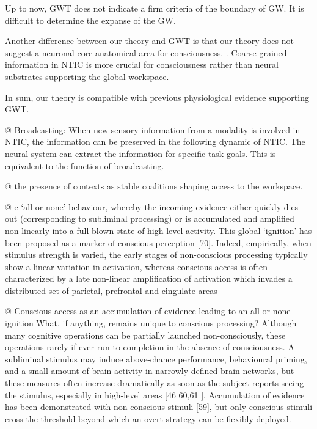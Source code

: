 \documentclass[utf8]{article}
\begin{document}
		Up to now, GWT does not indicate a firm criteria of the boundary of GW. It is difficult to determine the expanse of the GW.
		
		
		Another difference between our theory and GWT is that our theory does not suggest a neuronal core anatomical area for consciousness. . Coarse-grained information in NTIC is more crucial for consciousness rather than neural substrates supporting the global workspace.
		
		In sum, our theory is compatible with previous physiological evidence supporting GWT.  
\rlend
		\begin{WritingMaterials}
			
			
			@ Broadcasting: When new sensory information from a modality is involved in NTIC, the information can be preserved in the following dynamic of NTIC. The neural system can extract the information for specific task goals. This is equivalent to the function of broadcasting. 
		
			@ the presence of contexts as stable coalitions shaping access to the workspace.

			@ e ‘all-or-none’ behaviour, whereby the incoming evidence either quickly dies out (corresponding to subliminal processing) or is accumulated and amplified non-linearly into a full-blown state of high-level activity. This global ‘ignition’ has been proposed as a marker of conscious perception [70]. Indeed, empirically, when stimulus strength is varied, the early stages of non-conscious processing typically show a linear variation in activation, whereas conscious access is often characterized by a late non-linear amplification of activation which invades a distributed set of parietal, prefrontal and cingulate areas

			@ Conscious access as an accumulation of evidence leading to an all-or-none ignition What, if anything, remains unique to conscious processing? Although many cognitive operations can be partially launched non-consciously, these operations rarely if ever run to completion in the absence of consciousness. A subliminal stimulus may induce above-chance performance, behavioural priming, and a small amount of brain activity in narrowly defined brain networks, but these measures often increase dramatically as soon as the subject reports seeing the stimulus, especially in high-level areas [46 60,61  ]. Accumulation of evidence has been demonstrated with non-conscious stimuli [59], but only conscious stimuli cross the threshold beyond which an overt strategy can be fiexibly deployed. 


\end{WritingMaterials}
\end{document}
